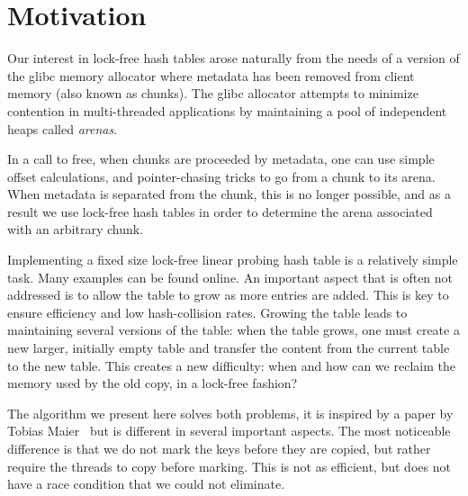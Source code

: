 \section{Motivation}
\label{sec:intro}

Our interest in lock-free hash tables arose naturally from the needs
of a version of the glibc memory allocator where metadata has been
removed from client memory (also known as chunks).  The glibc
allocator attempts to minimize contention in multi-threaded
applications by maintaining a pool of independent heaps called
\emph{arenas}.

In a call to free, when chunks are proceeded by metadata, one can use
simple offset calculations, and pointer-chasing tricks to go from a
chunk to its arena. When metadata is separated from the chunk,
this is no longer possible, and as a result we use lock-free hash
tables in order to determine the arena associated with an arbitrary
chunk.

Implementing a fixed size lock-free linear probing hash table is a
relatively simple task. Many examples can be found online. An
important aspect that is often not addressed is to allow the table to
grow as more entries are added. This is key to ensure efficiency and
low hash-collision rates. Growing the table leads to maintaining
several versions of the table: when the table grows, one must create a
new larger, initially empty table and transfer the content from the
current table to the new table. This creates a new difficulty: when
and how can we reclaim the memory used by the old copy, in a lock-free
fashion?

The algorithm we present here solves both problems,
it is inspired by a paper by Tobias Maier~\cite{MaierSD16}
but is different in several important aspects. The most noticeable difference
is that we do not mark the keys before they are copied, but rather require the
threads to copy before marking. This is not as efficient, but does not have
a race condition that we could not eliminate.




